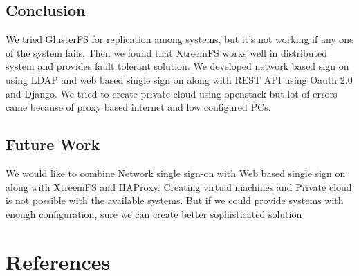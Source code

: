 \documentclass[12pt]{report}
\begin{document}
\section{Conclusion} 
We tried GlusterFS for replication among systems, but it’s not working if any one of the system fails. Then we found that XtreemFS works well in distributed system and provides fault tolerant solution. \newline
\underline{} \newline
We developed network based sign on using LDAP and web based single sign on along with REST API using Oauth 2.0 and Django. We tried to create private cloud using openstack but lot of errors came because of proxy based internet and low configured PCs.

\section{Future Work}
We would like to combine Network single sign-on with Web based single sign on along with XtreemFS and HAProxy. Creating virtual machines and Private cloud is not possible with the available systems. But if we could provide systems with enough configuration, sure we can create better sophisticated solution

\chapter{References}
\end{document}
